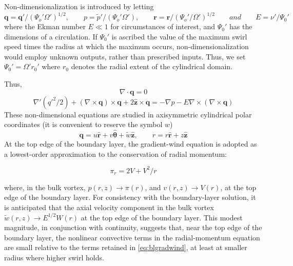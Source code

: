\documentclass[preprint, prX]{revtex4}
\begin{document}
Non-dimensionalization is introduced by letting
\begin{equation}
\mathbf{q}=\mathbf{q'}/(\Psi_o' \Omega')^{1/2}, \qquad p=\tilde{p}' /(\Psi_o' \Omega'), \qquad \mathbf{r} = \mathbf{r}/(\Psi_o'/\Omega')^{1/2} \qquad and \qquad E = \nu' / \Psi_0'
\label{eq:bl3}
\end{equation}
where the Ekman number $E \ll 1$ for circumstances of interest, and $\Psi_0'$ has the
dimensions of a circulation. If $\Psi_0'$ is ascribed the value of the maximum swirl speed times the radius at which the maximum occurs, non-dimensionalization would employ unknown outputs, rather than prescribed inputs. Thus, we set $\Psi_0' = \Omega' r_0'$ where $r_0$ denotes the radial extent of the cylindrical domain.

Thus,
\begin{equation}
\nabla \cdot \mathbf{q}=0
\label{eq:blcon}
\end{equation}
\begin{equation}
\nabla'(q'^2/2) +(\nabla \times \mathbf{q})\times \mathbf{q} + 2 \mathbf{\hat{z}} \times \mathbf{q}=-\nabla p - E \nabla \times (\nabla \times \mathbf{q})
\label{eq:blradmom}
\end{equation}
These non-dimensional equations are studied in axisymmetric cylindrical polar coordinates (it is convenient to reserve the symbol $w$)
\begin{equation}
\mathbf{q} = u \mathbf{\hat{r}} + v \mathbf{\hat{\theta}} +\tilde{w}\mathbf{\hat{z}}, \qquad r = r \mathbf{\hat{r}} + z \mathbf{\hat{z}}
\end{equation}
At the top edge of the boundary layer, the gradient-wind equation is adopted as a lowest-order approximation to the conservation of radial momentum:

\begin{equation}
\pi_r = 2 V + V^2 /r
\label{eq:blgradwind}
\end{equation}

where, in the bulk vortex, $p(r, z) \rightarrow \pi(r)$, and $v(r, z) \rightarrow V(r)$, at the top edge of the boundary layer. For consistency with the boundary-layer solution, it is anticipated that the axial velocity component in the bulk vortex $\tilde{w}(r,z) \rightarrow E^{1/2} W(r)$ at the top edge of the boundary layer. This modest magnitude, in conjunction with continuity, suggests that, near the top edge of the boundary layer, the nonlinear convective terms in the radial-momentum equation are small relative to the terms retained in \eqref{eq:blgradwind}, at least at smaller radius where higher swirl holds.
\end{document}
